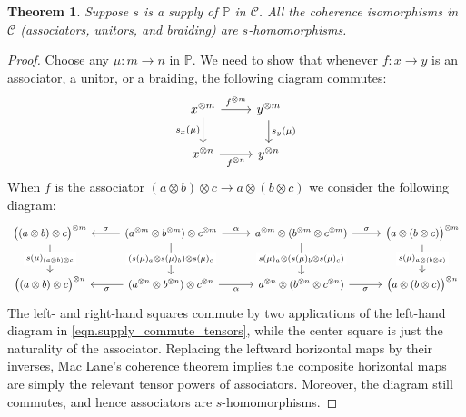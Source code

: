 \documentclass[11pt, oneside, article]{memoir}
\theoremstyle{plain}
\newtheorem{theorem}{Theorem}[chapter]
\theoremstyle{definition}
\theoremstyle{remark}
\newcommand{\cat}[1]{\mathcal{#1}}%
\newcommand{\tpow}[1]{^{\otimes #1}}
\newcommand{\pp}{\mathbb{P}}
\begin{document}
\begin{theorem}\label{thm.coherence_isos_homos}
Suppose $s$ is a supply of $\pp$ in $\cat{C}$. All the coherence isomorphisms in $\cat{C}$ (associators, unitors, and braiding) are $s$-homomorphisms.
\end{theorem}
\begin{proof}
Choose any $\mu\colon m\to n$ in $\pp$. We need to show that whenever $f\colon x\to y$ is an associator, a unitor, or a braiding, the following diagram commutes:
\[
 \begin{tikzcd}
	x\tpow{m}\ar[d, "s_x(\mu)"']\ar[r, "f\tpow{m}"]&
	y\tpow{m}\ar[d, "s_y(\mu)"]\\
	x\tpow{n}\ar[r, "f\tpow{n}"']&
	y\tpow{n}
\end{tikzcd}
\]
When $f$ is the associator $(a\otimes b)\otimes c\to a\otimes (b\otimes c)$ we consider the following diagram:
\[
\begin{tikzcd}[row sep=24pt, font=\small, column sep=25pt]
  \big((a\otimes b)\otimes c\big)\tpow{m}\ar[d, "s(\mu)_{(a\otimes b)\otimes c}" description]&
  (a\tpow{m}\otimes b\tpow{m})\otimes c\tpow{m}\ar[l, "\sigma"']\ar[r, "\alpha"]\ar[d, "(s(\mu)_a\otimes s(\mu)_b)\otimes s(\mu)_c" description]&
  a\tpow{m}\otimes (b\tpow{m}\otimes c\tpow{m})\ar[r, "\sigma"]\ar[d, "s(\mu)_a\otimes (s(\mu)_b\otimes s(\mu)_c)" description]&
  \big(a\otimes (b\otimes c)\big)\tpow{m}\ar[d, "s(\mu)_{a\otimes (b\otimes c)}" description]
  \\
  \big((a\otimes b)\otimes c\big)\tpow{n}&
  (a\tpow{n}\otimes b\tpow{n})\otimes c\tpow{n}\ar[l, "\sigma"]\ar[r, "\alpha"']&
  a\tpow{n}\otimes (b\tpow{n}\otimes c\tpow{n})\ar[r, "\sigma"']&
  \big(a\otimes (b\otimes c)\big)\tpow{n}
\end{tikzcd}
\]
The left- and right-hand squares commute by two applications of the left-hand diagram in \cref{eqn.supply_commute_tensors}, while the center square is just the naturality of the associator. Replacing the leftward horizontal maps by their inverses, Mac Lane's coherence theorem implies the composite horizontal maps are simply the relevant tensor powers of associators. Moreover, the diagram still commutes, and hence associators are $s$-homomorphisms.


\end{proof}
\end{document}
